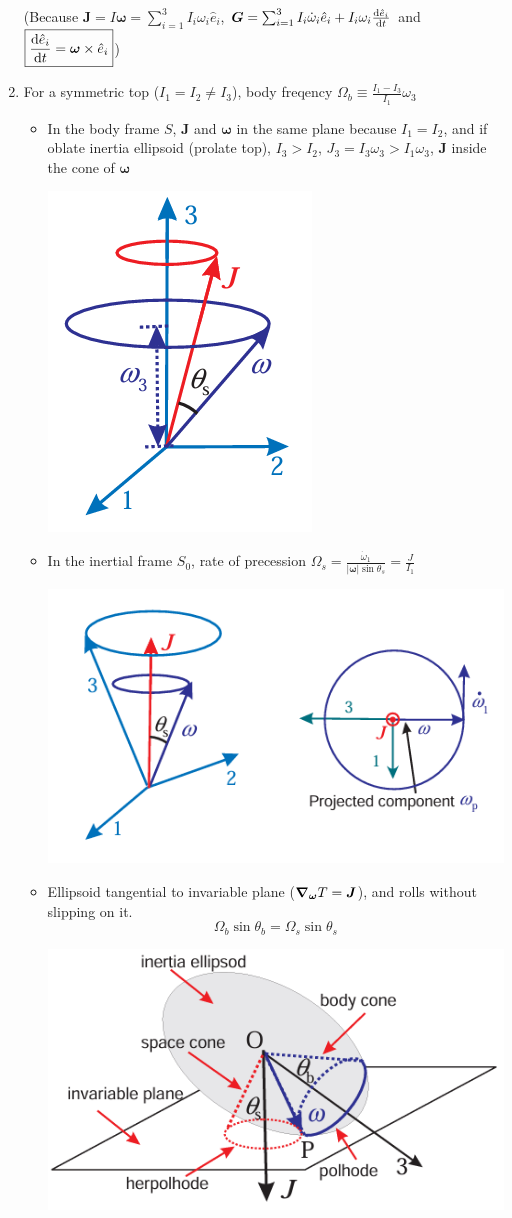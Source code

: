 \documentclass{article}
\theoremstyle{remark}
\theoremstyle{remark}
\begin{document}
\begin{enumerate}
    (Because $\bm{J}=I\bm{\omega} = \sum_{i=1}^{3} I_i\omega_i\hat{e}_i$, $\bm{G}=\sum_{i=1}^{3} I_i\dot\omega_i\hat{e}_i+I_i\omega_i\dv{\hat{e}_i}{t}$ and $\boxed{\dv{\hat{e}_i}{t}=\bm{\omega}\times\hat{e}_i}$)
    \item For a symmetric top ($I_1=I_2\neq I_3$), body freqency $\boxed{\Omega_b\equiv\frac{I_1-I_3}{I_1}\omega_3}$\begin{itemize}
        \item In the body frame $S$, $\bm{J}$ and $\bm{\omega}$ in the same plane because $I_1=I_2$, and if oblate inertia ellipsoid (prolate top), $I_3>I_2$, $J_3=I_3\omega_3>I_1\omega_3$, $\bm{J}$ inside the cone of $\bm{\omega}$
        \begin{center}
            \includegraphics[width=0.25\linewidth]{symmetric top body frame.png}
        \end{center}
        \item In the inertial frame $S_0$, rate of precession $\boxed{\Omega_s=\frac{\dot\omega_1}{|\bm{\omega}|\sin\theta_s}=\frac{J}{I_1}}$
        \begin{center}
            \includegraphics[width=0.6\linewidth]{rate of precession.png}
        \end{center}
        \item Ellipsoid tangential to invariable plane ($\grad_{\bm{\omega}}T=\bm{J}$), and rolls without slipping on it. 
        \[\boxed{\Omega_b\sin\theta_b=\Omega_s\sin\theta_s}\]
        \begin{center}
            \includegraphics[width=0.6\linewidth]{poinsot.png}

\end{center}
\end{itemize}
\end{enumerate}
\end{document}
